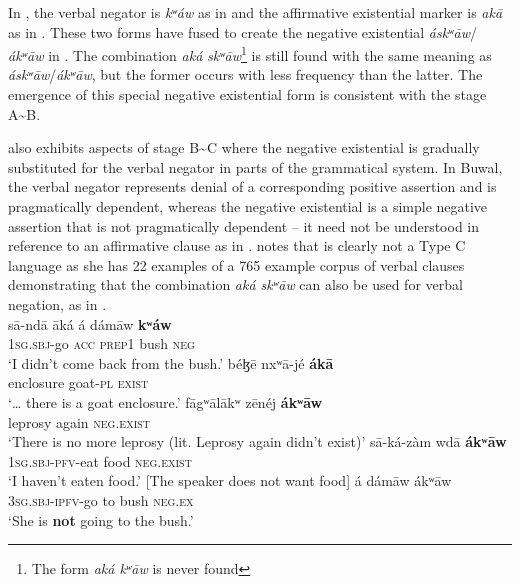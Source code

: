\documentclass[output=paper]{langsci/langscibook}
\begin{document}
In , the verbal negator is \textit{kʷ\'aw} as in  and the affirmative existential marker is \textit{ak\=a} as in . These two forms have fused to create the negative existential \textit{\'askʷ\=aw}/\textit{\'akʷ\=aw} in . The combination \textit{ak\'a} \textit{skʷ\=aw}\footnote{The form \textit{ak\'a kʷ\=aw} is never found} is still found with the same meaning as \textit{\'askʷ\=aw}/\textit{\'akʷ\=aw}, but the former occurs with less frequency than the latter. The emergence of this special negative existential form is consistent with the stage A{\textasciitilde}B.
  
 also exhibits aspects of stage B{\textasciitilde}C where the negative existential is gradually substituted for the verbal negator in parts of the grammatical system. In Buwal, the verbal negator represents denial of a corresponding positive assertion and is pragmatically dependent, whereas the negative existential is a simple negative assertion that is not pragmatically dependent -- it need not be understood in reference to an affirmative clause as in . 
\citet[293]{Viljoen2013} notes that  is clearly not a Type C
language as she has 22 examples of a 765 example corpus of verbal clauses
demonstrating that the combination \textit{ak\'a skʷ\=aw} can also be
used for verbal negation, as in .   
\ea\label{ex:buwal-bush-goat-leprosy-food-she.bush}
\\
\ea\label{ex:buwal-bush}
\gll s\=a-nd\=a \=ak\'a \'a d\'am\=aw \textbf{kʷ\'aw}\\
1\textsc{sg.sbj}-go \textsc{acc} \textsc{prep1} bush \textsc{neg}\\
\glt `I didn't come back from the bush.'
\ex\label{ex:buwal-goat}
\gll b\'eɮ\=e nxʷ\=a-j\'e \textbf{\'ak\=a}\\
enclosure goat-\textsc{pl} \textsc{exist}\\
\glt `\ldots{} there is a goat enclosure.'
\ex\label{ex:buwal-leprosy}
\gll f\=agʷ\=al\=akʷ z\=en\'ej \textbf{\'akʷ\=aw}\\
leprosy again \textsc{neg.exist}\\
\glt `There is no more leprosy (lit. Leprosy again didn't exist)'
\ex\label{ex:buwal-food}
\gll s\=a-k\'a-z\`am wd\=a \textbf{\'akʷ\=aw}\\
1\textsc{sg.sbj-pfv}-eat food \textsc{neg.exist}\\
\glt `I haven't eaten food.' [The speaker does not want food]
\ex\label{ex:buwal-she.bush}
 {\'a} {d\'am\=aw} {\'akʷ\=aw}%
\\
3\textsc{sg.sbj-ipfv}-go to bush \textsc{neg.ex}\\
\glt `She is \textbf{not} going to the bush.'
\z\z
\end{document}
